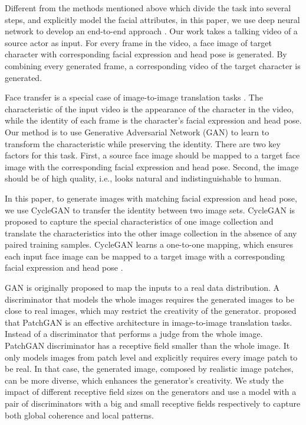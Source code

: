 \documentclass[letterpaper]{article} %
\begin{document}
	
	Different from the methods mentioned above which divide the task into several steps, and explicitly model the facial attributes, in this paper, we use deep neural network to develop an end-to-end approach \cite{lecun2015deep}. Our work takes a talking video of a source actor as input. For every frame in the video, a face image of target character with corresponding facial expression and head pose is generated. By combining every generated frame, a corresponding video of the target character is generated.
	
	Face transfer is a special case of image-to-image translation tasks \cite{isola2016image,zhu2017unpaired}. The characteristic of the input video is the appearance of the character in the video, while the identity of each frame is the character's facial expression and head pose. Our method is to use Generative Adversarial Network (GAN) \cite{goodfellow2014generative} to learn to transform the characteristic while preserving the identity. There are two key factors for this task. First, a source face image should be mapped to a target face image with the corresponding facial expression and head pose. Second, the image should be of high quality, i.e., looks natural and indistinguishable to human.
	
	In this paper, to generate images with matching facial expression and head pose, we use CycleGAN \cite{zhu2017unpaired} to transfer the identity between two image sets. CycleGAN is proposed to capture the special characteristics of one image collection and translate the characteristics into the other image collection in the absence of any paired training samples. CycleGAN learns a one-to-one mapping, which ensures each input face image can be mapped to a target image with a corresponding facial expression and head pose \cite{kim2017learning}. %
	
	GAN is originally proposed to map the inputs to a real data distribution. A discriminator that models the whole images requires the generated images to be close to real images, which may restrict the creativity of the generator. \cite{isola2016image} proposed that PatchGAN is an effective architecture in image-to-image translation tasks. Instead of a discriminator that performs a judge from the whole image. PatchGAN discriminator has a receptive field smaller than the whole image. It only models images from patch level and explicitly requires every image patch to be real. In that case, the generated image, composed by realistic image patches, can be more diverse, which enhances the generator's creativity. We study the impact of different receptive field sizes on the generators and use a model with a pair of discriminators with a big and small receptive fields respectively to capture both global coherence and local patterns.
	
\end{document}
